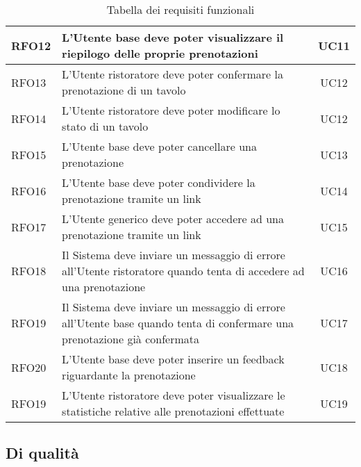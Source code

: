 \begin{table}[H]
\begin{tabularx}{\textwidth}{l|X|c}
		\hline
		RFO12       & L'Utente base deve poter visualizzare il riepilogo delle proprie prenotazioni                                             & UC11           \\
		\hline
		RFO13       & L'Utente ristoratore deve poter confermare la prenotazione di un tavolo                                                   & UC12           \\
		\hline
		RFO14       & L'Utente ristoratore deve poter modificare lo stato di un tavolo                                                          & UC12           \\
		\hline
		RFO15       & L'Utente base deve poter cancellare una prenotazione                                                                      & UC13           \\
		\hline
		RFO16       & L'Utente base deve poter condividere la prenotazione tramite un link                                                      & UC14           \\
		\hline
		RFO17       & L'Utente generico deve poter accedere ad una prenotazione tramite un link                                                 & UC15           \\
		\hline
		RFO18       & Il Sistema deve inviare un messaggio di errore all'Utente ristoratore quando tenta di accedere ad una prenotazione        & UC16           \\
		\hline
		RFO19       & Il Sistema deve inviare un messaggio di errore all'Utente base quando tenta di confermare una prenotazione già confermata & UC17           \\
		\hline
		RFO20       & L'Utente base deve poter inserire un feedback riguardante la prenotazione                                                 & UC18           \\
		\hline
		RFO19       & L'Utente ristoratore deve poter visualizzare le statistiche relative alle prenotazioni effettuate                         & UC19           \\
		\hline
	\end{tabularx}
	\caption{Tabella dei requisiti funzionali}
\end{table}

\subsection{Di qualità}


